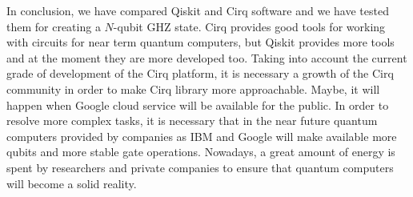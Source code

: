 \documentclass[11pt, a4paper, twoside, openright]{book}
\renewcommand{\'}[0]{\`}
\theoremstyle{definition}
\begin{document}
In conclusion, we have compared Qiskit and Cirq software and we have tested them for creating a $N$-qubit GHZ state. Cirq provides good tools for working with circuits for near term quantum computers, but Qiskit provides more tools and at the moment they are more developed too. 
Taking into account the current grade of development of the Cirq platform, it is necessary a growth of the Cirq community in order to make Cirq library more approachable. Maybe, it will happen when Google cloud service will be available for the public.
In order to resolve more complex tasks, it is necessary that in the near future quantum computers provided by companies as IBM and Google will make available more qubits and more stable gate operations. Nowadays, a great amount of energy is spent by researchers and private companies to ensure that quantum computers will become a solid reality. 



















\end{document}
